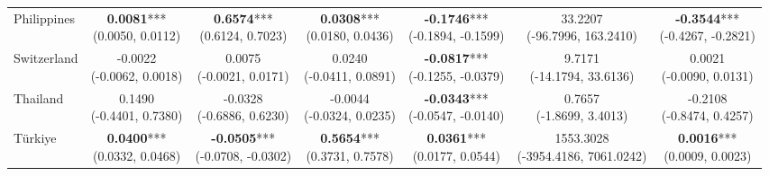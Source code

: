 \begin{table}[htbp]
{\begin{tabular}{l|cccccc}
Philippines          & \makecell{\textbf{0.0081}*** \\ \scriptsize{(0.0050, 0.0112)}} & \makecell{\textbf{0.6574}*** \\ \scriptsize{(0.6124, 0.7023)}} & \makecell{\textbf{0.0308}*** \\ \scriptsize{(0.0180, 0.0436)}} & \makecell{\textbf{-0.1746}*** \\ \scriptsize{(-0.1894, -0.1599)}} & \makecell{33.2207 \\ \scriptsize{(-96.7996, 163.2410)}} & \makecell{\textbf{-0.3544}*** \\ \scriptsize{(-0.4267, -0.2821)}} \\
Switzerland          & \makecell{-0.0022 \\ \scriptsize{(-0.0062, 0.0018)}} & \makecell{0.0075 \\ \scriptsize{(-0.0021, 0.0171)}} & \makecell{0.0240 \\ \scriptsize{(-0.0411, 0.0891)}} & \makecell{\textbf{-0.0817}*** \\ \scriptsize{(-0.1255, -0.0379)}} & \makecell{9.7171 \\ \scriptsize{(-14.1794, 33.6136)}} & \makecell{0.0021 \\ \scriptsize{(-0.0090, 0.0131)}} \\
Thailand             & \makecell{0.1490 \\ \scriptsize{(-0.4401, 0.7380)}} & \makecell{-0.0328 \\ \scriptsize{(-0.6886, 0.6230)}} & \makecell{-0.0044 \\ \scriptsize{(-0.0324, 0.0235)}} & \makecell{\textbf{-0.0343}*** \\ \scriptsize{(-0.0547, -0.0140)}} & \makecell{0.7657 \\ \scriptsize{(-1.8699, 3.4013)}} & \makecell{-0.2108 \\ \scriptsize{(-0.8474, 0.4257)}} \\
Türkiye              & \makecell{\textbf{0.0400}*** \\ \scriptsize{(0.0332, 0.0468)}} & \makecell{\textbf{-0.0505}*** \\ \scriptsize{(-0.0708, -0.0302)}} & \makecell{\textbf{0.5654}*** \\ \scriptsize{(0.3731, 0.7578)}} & \makecell{\textbf{0.0361}*** \\ \scriptsize{(0.0177, 0.0544)}} & \makecell{1553.3028 \\ \scriptsize{(-3954.4186, 7061.0242)}} & \makecell{\textbf{0.0016}*** \\ \scriptsize{(0.0009, 0.0023)}} \\

\end{tabular}}
\end{table}
